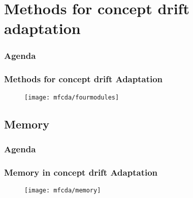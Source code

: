 \section{Methods for concept drift adaptation}
\begin{frame}
\frametitle{Agenda}
\tableofcontents[currentsection]
\end{frame}


\begin{frame}
\frametitle{Methods for concept drift Adaptation}

\begin{figure}[H]
	\centering
	\texttt{[image: mfcda/fourmodules]}
\end{figure}

\end{frame}

\subsection{Memory}

\begin{frame}
\frametitle{Agenda}
\tableofcontents[currentsubsection]
\end{frame}

\begin{frame}
\frametitle{Memory in concept drift Adaptation}

\begin{figure}[H]
	\centering
	\texttt{[image: mfcda/memory]}
\end{figure}

\end{frame}








